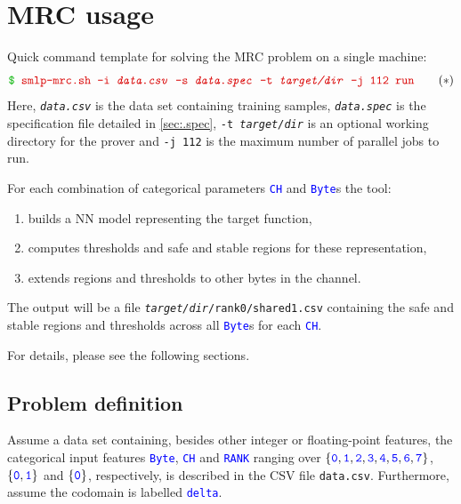 \documentclass[a4paper,parskip=half]{article} %
\newcommand*\cmdstyle\texttt
\newcommand*\file\cmdstyle
\newcommand*\literalColor{blue}
\newcommand*\cmd[1]{\cmdstyle{\textcolor{red!85!black}{#1}}}
\newcommand*\cmdline[1]{\cmdstyle{\textcolor{green!70!black}\$ }\cmd{#1}}
\newcommand*\literal[1]{\textcolor{\literalColor}{\cmdstyle{#1}}}
\newcommand*\progmrc{smlp-mrc.sh}
\begin{document}
\section{MRC usage}\label{sec:mrc}

Quick command template for solving the MRC problem on a single machine:
\begin{equation}
\cmdline{\progmrc{} -i \emph{data.csv} -s \emph{data.spec} -t \emph{target/dir} -j 112 run}
\tag{$*$}\label{cmd:mrc}
\end{equation}
Here, \file{\emph{data.csv}} is the data set containing training samples,
\file{\emph{data.spec}} is the specification file detailed in \cref{sec:.spec},
\cmdstyle{-t \emph{target/dir}} is an optional working directory for the prover and \cmdstyle{-j 112} is the maximum number of parallel jobs to run.

For each combination of categorical parameters \literal{CH} and \literal{Byte}s the tool: 
\begin{enumerate}
\item builds a NN model representing the target function,
\item computes thresholds and safe and stable regions for these representation,
\item extends regions and thresholds to other bytes in the channel.
\end{enumerate}

The output will be a file \file{\emph{target/dir}/rank0/shared1.csv} containing
the safe and stable regions and thresholds across all \literal{Byte}s for each
\literal{CH}.

For details, please see the following sections.


\subsection{Problem definition}\label{sec:mrc-def}
Assume a data set containing, besides other integer or floating-point features,
the categorical input features \literal{Byte},
\literal{CH} and \literal{RANK} ranging over
$\{\literal0,\literal1,\literal2,\literal3,\literal4,\literal5,\literal6,\literal7\}$,
$\{\literal0,\literal1\}$ and $\{\literal0\}$, respectively,
is described in the CSV file \file{data.csv}. Furthermore, assume the codomain
is labelled \literal{delta}.
\end{document}
